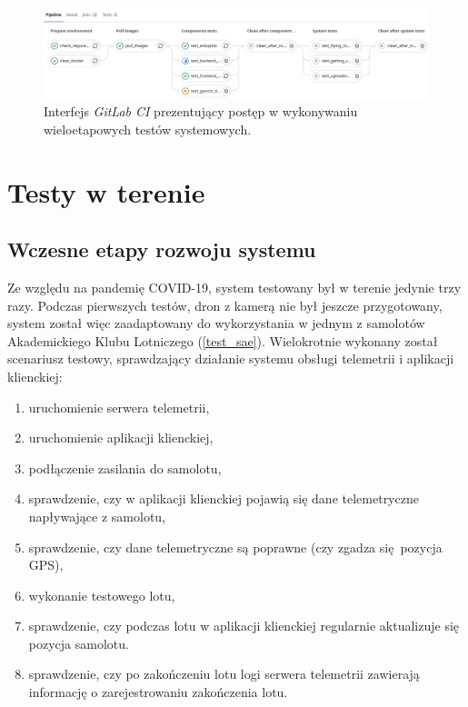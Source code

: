 \begin{figure}[H]
	\centering
	\includegraphics[width=\linewidth]{rys05/pipeline.png}
    \caption{
        Interfejs \textit{GitLab CI} prezentujący postęp w wykonywaniu
        wieloetapowych testów systemowych.
    }
	\label{pipeline_gitlab_ci}
\end{figure}

\section{Testy w terenie}

\subsection{Wczesne etapy rozwoju systemu} \label{early_tests}

Ze względu na pandemię COVID-19, system testowany był w terenie jedynie trzy razy.
Podczas pierwszych testów, dron z kamerą nie był jeszcze przygotowany, system został więc 
zaadaptowany do wykorzystania w jednym z samolotów Akademickiego Klubu Lotniczego (\ref{test_sae}).
Wielokrotnie wykonany został scenariusz testowy, sprawdzający działanie systemu obsługi telemetrii i 
aplikacji klienckiej:

\begin{enumerate}
    \item uruchomienie serwera telemetrii,
    \item uruchomienie aplikacji klienckiej,
    \item podłączenie zasilania do samolotu,
    \item sprawdzenie, czy w aplikacji klienckiej pojawią się dane telemetryczne napływające z samolotu,
    \item sprawdzenie, czy dane telemetryczne są poprawne (czy zgadza się pozycja GPS),
    \item wykonanie testowego lotu,
    \item sprawdzenie, czy podczas lotu w aplikacji klienckiej regularnie aktualizuje się pozycja samolotu. 
    \item sprawdzenie, czy po zakończeniu lotu logi serwera telemetrii zawierają informację o zarejestrowaniu zakończenia lotu.
\end{enumerate}



